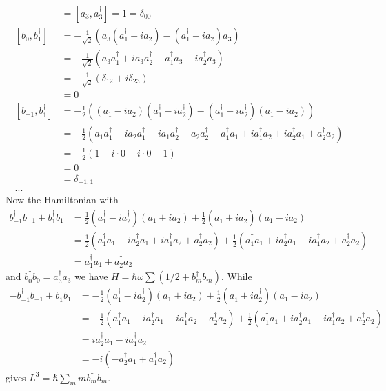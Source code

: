\documentclass[../main.tex]{subfiles}
\begin{document}
\begin{align}
[b_0,b_0^\dagger]&=[a_3,a_3^\dagger]=1=\delta_{00}\\
[b_0,b_1^\dagger]
&=-\frac{1}{\sqrt{2}}(a_3(a_1^\dagger+ia_2^\dagger)-(a_1^\dagger+ia_2^\dagger)a_3 )\\
&=-\frac{1}{\sqrt{2}}(a_3a_1^\dagger+ia_3a_2^\dagger-a_1^\dagger a_3-ia_2^\dagger a_3 )\\
&=-\frac{1}{\sqrt{2}}(\delta_{12}+i\delta_{23} )\\
&=0\\
[b_{-1},b_1^\dagger]&=-\frac{1}{2}((a_1-ia_2)(a_1^\dagger-ia_2^\dagger) - (a_1^\dagger-ia_2^\dagger)(a_1-ia_2) )\\
&=-\frac{1}{2}(a_1a_1^\dagger-ia_2a_1^\dagger-ia_1a_2^\dagger-a_2a_2^\dagger-a_1^\dagger a_1+ia_1^\dagger a_2+ia_2^\dagger a_1+a_2^\dagger a_2)\\
&=-\frac{1}{2}(1-i\cdot 0-i\cdot 0-1)\\
&=0\\
&=\delta_{-1,1}\\
...
\end{align}
Now the Hamiltonian with
\begin{align}
b_{-1}^\dagger b_{-1}+b_{1}^\dagger b_{1}
&=\frac{1}{2}(a_1^\dagger-ia_2^\dagger)(a_1+ia_2)+\frac{1}{2}(a_1^\dagger+ia_2^\dagger)(a_1-ia_2)\\
&=\frac{1}{2}(a_1^\dagger a_1-ia_2^\dagger a_1+ia_1^\dagger a_2+a_2^\dagger a_2)+\frac{1}{2}(a_1^\dagger a_1+ia_2^\dagger a_1-ia_1^\dagger a_2+a_2^\dagger a_2)\\
&=a_1^\dagger a_1+a_2^\dagger a_2
\end{align}
and $b_0^\dagger b_0=a_3^\dagger a_3$ we have $H=\hbar\omega\sum(1/2+b_m^\dagger b_m)$. While
\begin{align}
-b_{-1}^\dagger b_{-1}+b_{1}^\dagger b_{1}
&=-\frac{1}{2}(a_1^\dagger-ia_2^\dagger)(a_1+ia_2)+\frac{1}{2}(a_1^\dagger+ia_2^\dagger)(a_1-ia_2)\\
&=-\frac{1}{2}(a_1^\dagger a_1-ia_2^\dagger a_1+ia_1^\dagger a_2+a_2^\dagger a_2)+\frac{1}{2}(a_1^\dagger a_1+ia_2^\dagger a_1-ia_1^\dagger a_2+a_2^\dagger a_2)\\
&=ia_2^\dagger a_1-ia_1^\dagger a_2\\
&=-i(-a_2^\dagger a_1+a_1^\dagger a_2)
\end{align}
gives $L^3=\hbar\sum_m mb_m^\dagger b_m$.
\end{document}
